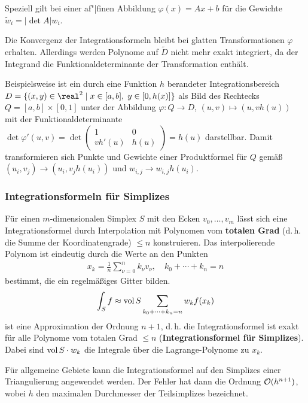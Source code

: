 Speziell gilt bei einer af"|finen Abbildung
$\varphi(x) = Ax + b$ für die Gewichte
$\widetilde{w}_i = |\det A| w_i$.

Die Konvergenz der Integrationsformeln bleibt bei glatten Transformationen
$\varphi$ erhalten.
Allerdings werden Polynome auf $\widetilde{D}$ nicht mehr exakt integriert, da
der Integrand die Funktionaldeterminante der Transformation enthält.

\linie

Beispielsweise ist ein durch eine Funktion $h$ berandeter
Integrationsbereich \\
$D = \{(x, y) \in \real^2 \;|\; x \in [a, b],\; y \in [0, h(x)]\}$
als Bild des Rechtecks $Q = [a, b] \times [0, 1]$ unter der Abbildung
$\varphi\colon Q \rightarrow D$, $(u, v) \mapsto (u, v h(u))$ mit der
Funktionaldeterminante \\
$\det \varphi'(u, v) =
\det\begin{pmatrix}1 & 0\\vh'(u) & h(u)\end{pmatrix} = h(u)$
darstellbar.
Damit transformieren sich Punkte und Gewichte einer Produktformel für $Q$
gemäß $(u_i, v_j) \rightarrow (u_i, v_j h(u_i))$ und
$w_{i,j} \rightarrow w_{i,j} h(u_i)$.

\subsubsection{%
    Integrationsformeln für Simplizes%
}

Für einen $m$-dimensionalen Simplex $S$ mit den Ecken $v_0, \dotsc, v_m$ lässt
sich eine Integrationsformel durch Interpolation mit Polynomen vom
\textbf{totalen Grad}
(d.\,h. die Summe der Koordinatengrade) $\le n$ konstruieren.
Das interpolierende Polynom ist eindeutig durch die Werte an den Punkten
\begin{align*}
    x_k = \frac{1}{n} \sum_{\nu=0}^n k_\nu v_\nu, \quad
    k_0 + \dotsb + k_n = n
\end{align*}
bestimmt, die ein regelmäßiges Gitter bilden.
\begin{align*}
    \int_S f \approx
    \operatorname{vol} S \sum_{k_0 + \dotsb + k_n = n} w_k f(x_k)
\end{align*}
ist eine Approximation der Ordnung $n + 1$, d.\,h.
die Integrationsformel ist exakt für alle Polynome vom totalen Grad $\le n$
(\textbf{Integrationsformel für Simplizes}).
Dabei sind $\operatorname{vol} S \cdot w_k$ die Integrale über die Lagrange-Polynome
zu $x_k$.

Für allgemeine Gebiete kann die Integrationsformel auf den Simplizes einer
Triangulierung angewendet werden.
Der Fehler hat dann die Ordnung $\mathcal{O}(h^{n+1})$, wobei $h$ den maximalen
Durchmesser der Teilsimplizes bezeichnet.

